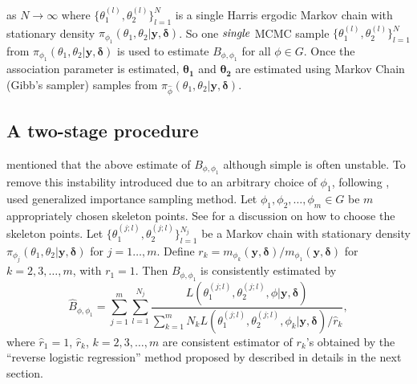 \documentclass[11pt]{article}
\theoremstyle{remboldstyle}
\newcommand{\y}{{\boldsymbol{y}}}
\newcommand{\de}{{\boldsymbol{\delta}}}
\begin{document}
as $N \rightarrow \infty$ where $\{\theta_1^{(l)}, \theta_2^{(l)}\}_{l=1}^{N}$  is a single Harris ergodic Markov chain with stationary density $\pi_{\phi_1}(\theta_1, \theta_2| \y, \de)$. So one $\it{single}$ MCMC sample $\{\theta_1^{(l)}, \theta_2^{(l)}\}_{l=1}^{N}$ from $\pi_{\phi_1}(\theta_1, \theta_2| \y, \de)$ is used to estimate $B_{\phi,\phi_1}$ for all $\phi \in G$. Once the association parameter is estimated, $\mathbf{\theta_1}$ and $\mathbf{\theta_2}$ are estimated using Markov Chain (Gibb's sampler) samples from $\pi_{\hat{\phi}}(\theta_1, \theta_2| \y, \de)$.

\subsection{A two-stage procedure}
\label{subsec:twostage}
\noindent
\cite{roy:2014} mentioned that the above estimate of $B_{\phi,\phi_1}$ although simple is often unstable. To remove this instability introduced due to an arbitrary choice of $\phi_1$, following \cite{doss:2010}, \cite{roy:2014} used generalized importance sampling method. Let $\phi_1, \phi_2, \dots, \phi_m \in G$ be $m$ appropriately chosen skeleton points. See \cite{roy:zhu:2014} for a discussion on how to choose the skeleton points. Let $\{\theta_1^{(j;l)}, \theta_2^{(j;l)}\}_{l=1}^{N_j}$ be a Markov chain with stationary density $\pi_{\phi_j}(\theta_1, \theta_2| \y, \de)$ for $j=1\dots,m$. Define $r_k = m_{\phi_k}(\y, \de)/ m_{\phi_1}(\y, \de) $ for
$k = 2, 3, \dots, m$, with $r_1=1$. Then $B_{\phi, \phi_1}$ is consistently estimated by
\begin{equation}
  \label{eq:bf2}
   \hat{B}_{\phi, \phi_1} = \sum_{j =1}^m \sum_{l =1}^{N_j} \frac{ L(\theta_1^{(j;l)}, \theta_2^{(j;l)}, \phi| \y, \de)}{\sum_{k =1}^m N_k L(\theta_1^{(j;l)}, \theta_2^{(j;l)}, \phi_k| \y, \de)/ \hat{r}_k},
\end{equation}
where $\hat {r}_1 =1$, $\hat{r}_k$, $k = 2, 3, \dots, m$ are consistent estimator of $r_k$'s obtained by the ``reverse logistic regression'' method proposed by \cite{geyer:1994} described in details in the next section.
\end{document}
